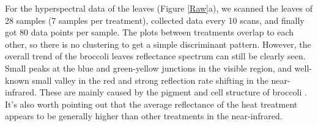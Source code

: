 \documentclass[12pt,a4paper]{article}
\begin{document}
For the hyperspectral data of the leaves (Figure \ref{Raw}a), we scanned the leaves of 28 samples (7 samples per treatment), collected data every 10 scans, and finally got 80 data points per sample. The plots between treatments overlap to each other, so there is no clustering to get a simple discriminant pattern. However, the overall trend of the broccoli leaves reflectance spectrum can still be clearly seen. Small peaks at the blue and green-yellow junctions in the visible region, and well-known small valley in the red and strong reflection rate shifting in the near-infrared. These are mainly caused by the pigment and cell structure of broccoli \citep{gates1965spectral}. It's also worth pointing out that the average reflectance of the heat treatment appears to be generally higher than other treatments in the near-infrared.
\end{document}
